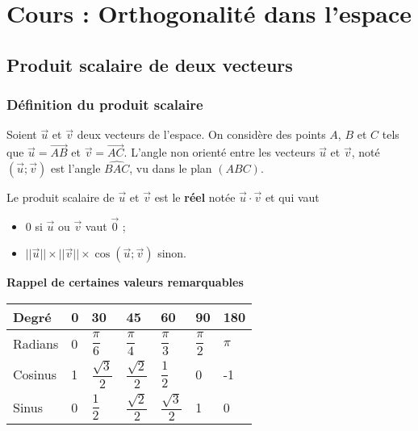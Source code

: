 \documentclass[11pt,fleqn, openany]{book} %
\begin{document}


\chapter{Cours : Orthogonalité dans l'espace}


\section{Produit scalaire de deux vecteurs}


\subsection{Définition du produit scalaire}


\begin{definition}Soient $\vec u$ et $\vec v$ deux vecteurs de l'espace. On considère des points $A$, $B$ et $C$ tels que $\vec u = \overrightarrow{AB}$ et $\vec v= \overrightarrow{AC}$. L'angle non orienté entre les vecteurs $\vec u$ et $\vec v$, noté $(\vec u;\vec v)$ est  l'angle $\widehat{BAC}$, vu dans le plan $(ABC)$.\end{definition}

\begin{definition}Le produit scalaire de $\vec u$ et $\vec v$ est le \textbf{réel} notée $\vec u \cdot \vec v$ et qui vaut
\begin{itemize}
\item 0 si $\vec u$ ou $\vec v$ vaut $\overrightarrow{0}$ ;
\item $\lvert\lvert\vec u\rvert\rvert \times \lvert\lvert\vec v\rvert\rvert \times \cos (\vec u ; \vec v)$ sinon.
\end{itemize}\end{definition}

\textbf{Rappel de certaines valeurs remarquables}

\begin{center}
\renewcommand{\arraystretch}{2.5}
\noindent \begin{tabularx}{0.9\linewidth}{|X|XXXXXX|}
\hline
Degré & 0 & 30 & 45 & 60 & 90 & 180 \\
\hline
Radians & 0 & $\dfrac{\pi}{6}$ & $\dfrac{\pi}{4}$ & $\dfrac{\pi}{3}$ & $\dfrac{\pi}{2}$ & $\pi$ \\
\hline
Cosinus & 1 & $\dfrac{\sqrt{3}}{2}$ & $\dfrac{\sqrt{2}}{2}$ & $\dfrac{1}{2}$ & 0 & -1\\
\hline
Sinus & 0 & $\dfrac{1}{2}$ & $\dfrac{\sqrt{2}}{2}$ & $\dfrac{\sqrt{3}}{2}$ & 1 & 0\\
\hline
\end{tabularx}
\end{center}
\end{document}
